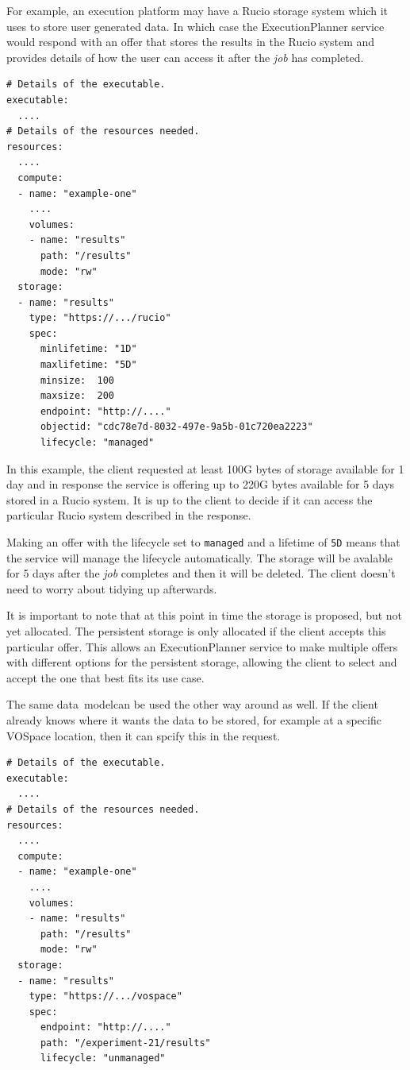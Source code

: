 \documentclass[11pt,a4paper]{ivoa}
\newcommand{\datamodel} {data~model}
\newcommand{\vospace} {VOSpace}
\newcommand{\execplanner} {ExecutionPlanner}
\newcommand{\rucio} {Rucio}
\newcommand{\codeword}[1] {\texttt{#1}}
\newcommand{\job} {\textit{job}}
\begin{document}
For example, an execution platform may have a \rucio{} storage system which
it uses to store user generated data.
In which case the \execplanner{} service would respond with an offer that
stores the results in the \rucio{} system and provides details of how the user
can access it after the \job{} has completed.

\begin{lstlisting}[]
# Details of the executable.
executable:
  ....
# Details of the resources needed.
resources:
  ....
  compute:
  - name: "example-one"
    ....
    volumes:
    - name: "results"
      path: "/results"
      mode: "rw"
  storage:
  - name: "results"
    type: "https://.../rucio"
    spec:
      minlifetime: "1D"
      maxlifetime: "5D"
      minsize:  100
      maxsize:  200
      endpoint: "http://...."
      objectid: "cdc78e7d-8032-497e-9a5b-01c720ea2223"
      lifecycle: "managed"
\end{lstlisting}

In this example, the client requested at least 100G bytes of storage available for 1 day
and in response the service is offering up to 220G bytes available for 5 days stored in a
\rucio{} system.
It is up to the client to decide if it can access the particular \rucio{} system described
in the response.

Making an offer with the lifecycle set to \codeword{managed} and a lifetime of \codeword{5D}
means that the service will manage the lifecycle automatically.
The storage will be avalable for 5 days after the \job{} completes and then it will be deleted.
The client doesn't need to worry about tidying up afterwards.

It is important to note that at this point in time the storage is proposed, but not yet allocated.
The persistent storage is only allocated if the client accepts this particular offer.
This allows an \execplanner{} service to make multiple offers with different options for the
persistent storage, allowing the client to select and accept the one that best fits its use case.

The same \datamodel can be used the other way around as well.
If the client already knows where it wants the data to be stored, for example at a specific
\vospace{} location, then it can spcify this in the request.

\begin{lstlisting}[]
# Details of the executable.
executable:
  ....
# Details of the resources needed.
resources:
  ....
  compute:
  - name: "example-one"
    ....
    volumes:
    - name: "results"
      path: "/results"
      mode: "rw"
  storage:
  - name: "results"
    type: "https://.../vospace"
    spec:
      endpoint: "http://...."
      path: "/experiment-21/results"
      lifecycle: "unmanaged"
\end{lstlisting}
\end{document}
